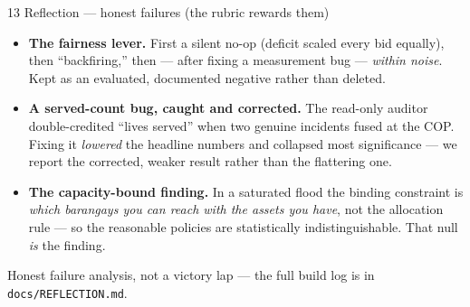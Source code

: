 \documentclass[aspectratio=169,11pt]{beamer}
\begin{document}
\begin{frame}{13 \;\; Reflection --- honest failures (the rubric rewards them)}
  \small
  \begin{itemize}
    \item \textbf{The fairness lever.} First a silent no-op (deficit scaled every bid equally), then
      ``backfiring,'' then --- after fixing a measurement bug --- \emph{within noise}. Kept as an
      evaluated, documented negative rather than deleted.
    \item \textbf{A served-count bug, caught and corrected.} The read-only auditor double-credited
      ``lives served'' when two genuine incidents fused at the COP. Fixing it \emph{lowered} the
      headline numbers and collapsed most significance --- we report the corrected, weaker result
      rather than the flattering one.
    \item \textbf{The capacity-bound finding.} In a saturated flood the binding constraint is
      \emph{which barangays you can reach with the assets you have}, not the allocation rule ---
      so the reasonable policies are statistically indistinguishable. That null \emph{is} the finding.
  \end{itemize}
  \vspace{0.2em}
  \footnotesize Honest failure analysis, not a victory lap --- the full build log is in
  \texttt{docs/REFLECTION.md}.
\end{frame}
\end{document}
